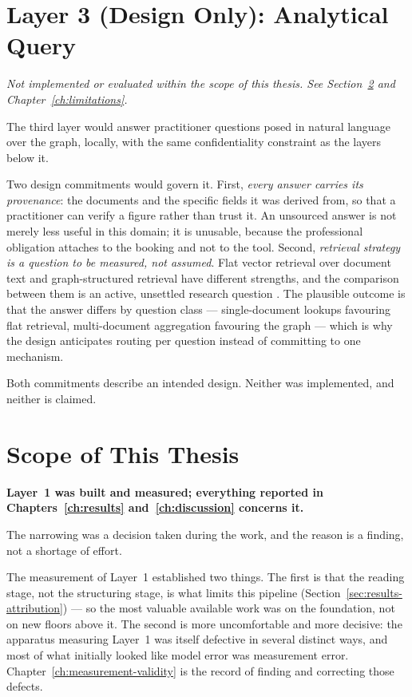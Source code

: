 \section{Layer 3 (Design Only): Analytical Query}
\label{sec:design-layer3}

\emph{Not implemented or evaluated within the scope of this thesis. See
Section~\ref{sec:design-scope} and Chapter~\ref{ch:limitations}.}

The third layer would answer practitioner questions posed in natural language over the graph,
locally, with the same confidentiality constraint as the layers below it.

Two design commitments would govern it. First, \emph{every answer carries its provenance}:
the documents and the specific fields it was derived from, so that a practitioner can verify a
figure rather than trust it. An unsourced answer is not merely less useful in this domain; it
is unusable, because the professional obligation attaches to the booking and not to the tool.
Second, \emph{retrieval strategy is a question to be measured, not assumed}. Flat vector
retrieval over document text and graph-structured retrieval have different strengths, and the
comparison between them is an active, unsettled research question
\parencite{han2025,edge2024graphrag}. The plausible outcome is that the answer differs by question
class --- single-document lookups favouring flat retrieval, multi-document aggregation
favouring the graph --- which is why the design anticipates routing per question instead of
committing to one mechanism.

Both commitments describe an intended design. Neither was implemented, and neither is claimed.

\section{Scope of This Thesis}
\label{sec:design-scope}

\textbf{Layer~1 was built and measured; everything reported in Chapters~\ref{ch:results}
and~\ref{ch:discussion} concerns it.}

The narrowing was a decision taken during the work, and the reason is a finding, not a
shortage of effort.

The measurement of Layer~1 established two things. The first is that the reading stage, not the
structuring stage, is what limits this pipeline (Section~\ref{sec:results-attribution}) --- so the
most valuable available work was on the foundation, not on new floors above it. The second is
more uncomfortable and more decisive: the apparatus measuring Layer~1 was itself defective in
several distinct ways, and most of what initially looked like model error was measurement error.
Chapter~\ref{ch:measurement-validity} is the record of finding and correcting those defects.

